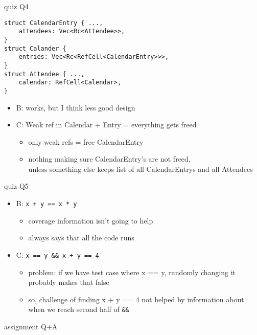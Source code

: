 \begin{frame}[fragile]{quiz Q4}
\begin{Verbatim}[fontsize=\small]
struct CalendarEntry { ...,
    attendees: Vec<Rc<Attendee>>,
}
struct Calander { 
    entries: Vec<Rc<RefCell<CalendarEntry>>>,
}
struct Attendee { ...,
    calendar: RefCell<Calendar>,
}
\end{Verbatim}
    \begin{itemize}
    \item B: works, but I think less good design
    \item C: Weak ref in Calendar + Entry = everything gets freed
        \begin{itemize}
        \item only weak refs = free CalendarEntry
        \item nothing making sure CalendarEntry's are not freed, \\ unless 
        something else keeps list of all CalendarEntrys and all Attendees
        \end{itemize}
    \end{itemize}
\end{frame}

\begin{frame}[fragile]{quiz Q5}
    \begin{itemize}
    \item B: \verb|x + y == x * y|
        \begin{itemize}
        \item coverage information isn't going to help
        \item always says that all the code runs
        \end{itemize}
    \item C: \verb|x == y && x + y == 4|
        \begin{itemize}
        \item problem: if we have test case where x == y, 
            randomly changing it probably makes that false 
        \item so, challenge of finding x + y == 4 not helped by information about
            when we reach second half of \verb|&&|
        \end{itemize}
    \end{itemize}
\end{frame}

\begin{frame}{assignment Q+A}
\end{frame}

